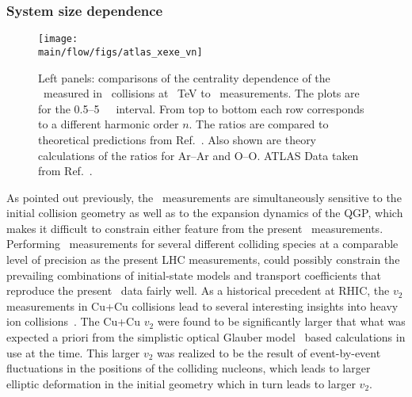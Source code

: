 \subsubsection{System size dependence}
\label{sec:flow_sizedep}

\begin{figure}[!ht]
\begin{center}
\texttt{[image: \\main/flow/figs/atlas\_xexe\_vn]}
\caption{
Left panels: comparisons of the centrality dependence of the \vn\ measured 
  in \pbpb\ collisions at ~TeV to \xexe\ measurements. 
The plots are for the 0.5--5~\UGeVc\ \pT\ interval. 
From top to bottom each row corresponds to a different harmonic order $n$.
The ratios are compared to theoretical predictions from Ref.~\cite{Giacalone:2017dud}.
Also shown are theory calculations of the ratios for Ar--Ar and O--O.
ATLAS Data taken from Ref.~\cite{ATLAS-CONF-2018-011}.
}
\label{fig:atlas_xexe_vn}
\end{center}
\end{figure}

As pointed out previously, the \vn\ measurements are simultaneously
  sensitive to the initial collision geometry as well as to the 
  expansion dynamics of the QGP, which makes it difficult to 
  constrain either feature from the present \vn\ measurements.
Performing \vn\ measurements for several different colliding species
  at a comparable level of precision as the present LHC measurements,  
  could possibly constrain the prevailing combinations of initial-state 
  models and transport coefficients that reproduce the present \vn\ data 
  fairly well.
As a historical precedent at RHIC, the $v_2$ measurements in Cu+Cu 
  collisions lead to several interesting insights into heavy ion 
  collisions~\cite{Adare:2006ti}.
The Cu+Cu $v_2$ were found to be significantly larger that what was 
  expected a priori from the simplistic optical Glauber model~\cite{Miller:2007ri}
  based calculations in use at the time.
This larger $v_2$ was realized to be the result of event-by-event fluctuations
  in the positions of the colliding nucleons, which leads to larger
  elliptic deformation in the initial geometry which in turn leads 
  to larger $v_2$.


